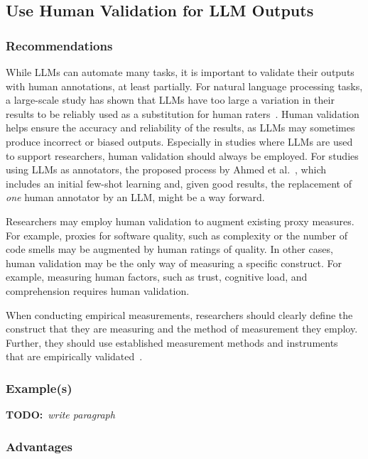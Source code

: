 \documentclass[11pt]{article}
\newcommand{\todo}[1]{{\textbf{TODO:}\ \textit{#1}}} %
\begin{document}
\subsection{Use Human Validation for LLM Outputs}

\subsubsection{Recommendations}

While LLMs can automate many tasks, it is important to validate their outputs with human annotations, at least partially. 
For natural language processing tasks, a large-scale study has shown that LLMs have too large a variation in their results to be reliably used as a substitution for human raters~\cite{DBLP:journals/corr/abs-2406-18403}. 
Human validation helps ensure the accuracy and reliability of the results, as LLMs may sometimes produce incorrect or biased outputs.
Especially in studies where LLMs are used to support researchers, human validation should always be employed.
For studies using LLMs as annotators, the proposed process by Ahmed et al.~\cite{DBLP:journals/corr/abs-2408-05534}, which includes an initial few-shot learning and, given good results, the replacement of \emph{one} human annotator by an LLM, might be a way forward.

Researchers may employ human validation to augment existing proxy measures.
For example, proxies for software quality, such as complexity or the number of code smells may be augmented by human ratings of quality.
In other cases, human validation may be the only way of measuring a specific construct.
For example, measuring human factors, such as trust, cognitive load, and comprehension requires human validation.

When conducting empirical measurements, researchers should clearly define the construct that they are measuring and the method of measurement they employ.
Further, they should use established measurement methods and instruments~\cite{} that are empirically validated~\cite{}.

\subsubsection{Example(s)}

\todo{write paragraph}


\subsubsection{Advantages}
\end{document}

